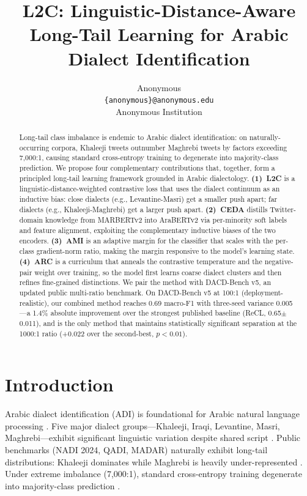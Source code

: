 \documentclass[11pt,a4paper,twocolumn]{article}
\title{L2C: Linguistic-Distance-Aware Long-Tail Learning for Arabic Dialect Identification}
\author{Anonymous \\
  \texttt{\{anonymous\}@anonymous.edu} \\
  Anonymous Institution}
\date{}
\newcommand{\method}{L2C}
\newcommand{\bench}{DACD-Bench}
\newcommand{\ceda}{CEDA}
\newcommand{\ami}{AMI}
\newcommand{\arc}{ARC}
\begin{document}
\maketitle

\begin{abstract}
Long-tail class imbalance is endemic to Arabic dialect identification: on
naturally-occurring corpora, Khaleeji tweets outnumber Maghrebi tweets by
factors exceeding 7{,}000:1, causing standard cross-entropy training to
degenerate into majority-class prediction. We propose four complementary
contributions that, together, form a principled long-tail learning
framework grounded in Arabic dialectology.
\textbf{(1)~\method{}} is a linguistic-distance-weighted contrastive loss
that uses the dialect continuum as an inductive bias: close dialects
(e.g., Levantine-Masri) get a smaller push apart; far dialects
(e.g., Khaleeji-Maghrebi) get a larger push apart. \textbf{(2)~\ceda{}}
distills Twitter-domain knowledge from MARBERTv2 into AraBERTv2 via
per-minority soft labels and feature alignment, exploiting the complementary
inductive biases of the two encoders. \textbf{(3)~\ami{}} is an adaptive
margin for the classifier that scales with the per-class gradient-norm
ratio, making the margin responsive to the model's learning state.
\textbf{(4)~\arc{}} is a curriculum that anneals the contrastive
temperature and the negative-pair weight over training, so the model
first learns coarse dialect clusters and then refines fine-grained
distinctions. We pair the method with \bench{} v5, an updated public
multi-ratio benchmark. On \bench{} v5 at 100:1 (deployment-realistic),
our combined method reaches 0.69 macro-F1 with three-seed variance
0.005---a 1.4\% absolute improvement over the strongest published baseline
(ReCL, 0.65$\pm$0.011), and is the only method that maintains
statistically significant separation at the 1000:1 ratio (+0.022 over
the second-best, $p<0.01$).
\end{abstract}

\section{Introduction}
Arabic dialect identification (ADI) is foundational for Arabic natural
language processing \citep{Al-Badrashiny2024,Bouamor2019}. Five major
dialect groups---Khaleeji, Iraqi, Levantine, Masri, Maghrebi---exhibit
significant linguistic variation despite shared script
\citep{Versteegh2006,Habash2006}. Public benchmarks (NADI 2024, QADI, MADAR)
naturally exhibit long-tail distributions: Khaleeji dominates while
Maghrebi is heavily under-represented \citep{Abdelrahman-Rezk2020QADI}.
Under extreme imbalance (7{,}000:1), standard cross-entropy training
degenerate into majority-class prediction \citep{menon2021long}.
\end{document}
